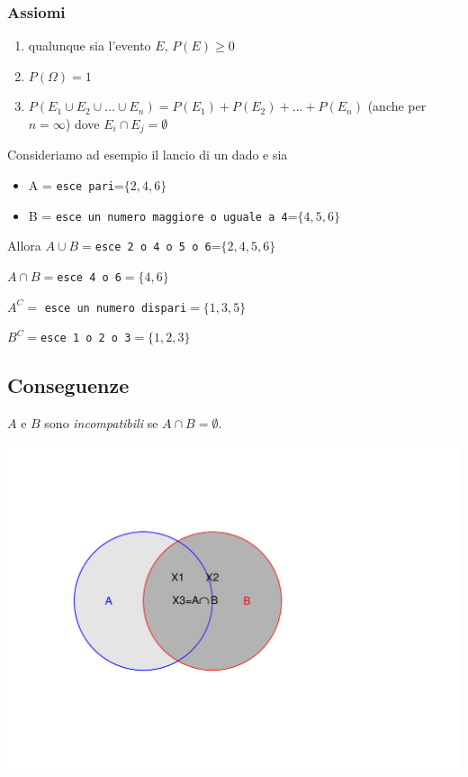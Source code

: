 \documentclass[onecolumn,12pt]{book}\usepackage[]{graphicx}\usepackage[]{color}
\makeatletter
\def\maxwidth{ %
  \ifdim\Gin@nat@width>\linewidth
    \linewidth
  \else
    \Gin@nat@width
  \fi
}
\newenvironment{knitrout}{}{} %
\makeatother
\begin{document}
\subsubsection{ Assiomi}
\begin{enumerate}
\item qualunque sia l'evento $E$, $P(E)\geq 0$
\item $P(\Omega)=1$
\item  $P(E_1\cup E_2\cup\ldots \cup E_n)=P(E_1)+P(E_2)+\ldots +P(E_n)$ (anche per $n=\infty$) dove $E_i\cap E_j=\emptyset$
\end{enumerate}

Consideriamo ad esempio il lancio di un dado e sia
\begin{itemize}
\item  A = \texttt{esce pari}=$\{2,4,6\}$
\item  B = \texttt{esce un numero maggiore o uguale a 4}=$\{4,5,6\}$
\end{itemize}


Allora
$A\cup B=$\texttt{esce 2 o 4 o 5 o 6}=$\{2,4,5,6\}$

$A\cap B=$\texttt{esce 4 o 6}$=\{4,6\}$

$A^C=$ \texttt{esce un numero dispari}$=\{1,3,5\}$

$B^C=$\texttt{esce 1 o 2 o 3}$=\{1,2,3\}$
        
        
\subsection{Conseguenze}   


   
$A$ e $B$ sono \emph{incompatibili} se $A\cap B=\emptyset$.

\begin{knitrout}
\color{fgcolor}
\includegraphics[width=\maxwidth]{figure/unnamed-chunk-70-1} 

\end{knitrout}
\end{document}
